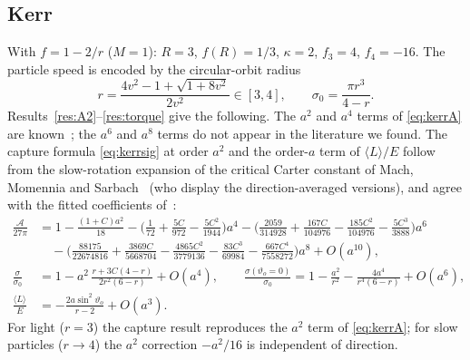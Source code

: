\documentclass[11pt,a4paper]{article}
\theoremstyle{remark}
\numberwithin{equation}{section}
\begin{document}
\subsection{Kerr}
With $f=1-2/r$ ($M=1$): $R=3$, $f(R)=1/3$, $\kappa=2$, $f_3=4$, $f_4=-16$. The particle
speed is encoded by the circular-orbit radius
\begin{equation}
r=\frac{4v^2-1+\sqrt{1+8v^2}}{2v^2}\in[3,4],\qquad \sigma_0=\frac{\pi r^3}{4-r}.
\end{equation}
Results~\ref{res:A2}--\ref{res:torque} give the following. The $a^2$ and $a^4$ terms of \eqref{eq:kerrA} are
known~\cite{Bozza2006,GrallaLupsasca2020shape,KobialkoGaltsov2026}; the $a^6$ and $a^8$ terms do not appear in the literature we found. The
capture formula \eqref{eq:kerrsig} at order $a^2$ and the order-$a$ term of $\langle L\rangle/E$ follow from the slow-rotation
expansion of the critical Carter constant of Mach, Momennia and Sarbach~\cite{MachMomenniaSarbach2026} (who display
the direction-averaged versions), and agree with the fitted coefficients of~\cite{Karydas2026}:
\begin{align}
\frac{\mathcal A}{27\pi}&=1-\frac{(1+C)a^2}{18}-\Big(\frac1{72}+\frac{5C}{972}-\frac{5C^2}{1944}\Big)a^4
-\Big(\frac{2059}{314928}+\frac{167C}{104976}-\frac{185C^2}{104976}-\frac{5C^3}{3888}\Big)a^6\nonumber\\
&\quad-\Big(\frac{88175}{22674816}+\frac{3869C}{5668704}-\frac{4865C^2}{3779136}-\frac{83C^3}{69984}-\frac{667C^4}{7558272}\Big)a^8+O(a^{10}),\label{eq:kerrA}\\
\frac{\sigma}{\sigma_0}&=1-a^2\,\frac{r+3C(4-r)}{2r^2(6-r)}+O(a^4),\qquad
\frac{\sigma(\vartheta_o=0)}{\sigma_0}=1-\frac{a^2}{r^2}-\frac{4a^4}{r^4(6-r)}+O(a^6),\label{eq:kerrsig}\\
\frac{\langle L\rangle}{E}&=-\frac{2a\sin^2\vartheta_o}{r-2}+O(a^3).
\end{align}
For light ($r=3$) the capture result reproduces the $a^2$ term of \eqref{eq:kerrA}; for slow particles
($r\to4$) the $a^2$ correction $-a^2/16$ is independent of direction.
\end{document}
